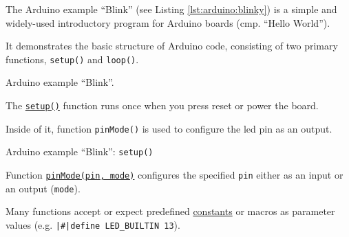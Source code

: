 \begin{frame}
    \par The Arduino\textregistered{} example ``Blink'' (see Listing \ref{lst:arduino:blinky}) is a simple and widely-used introductory program for Arduino\textregistered{} boards (cmp. ``Hello World'').
    \par It demonstrates the basic structure of Arduino\textregistered{} code, consisting of two primary functions, \texttt{setup()} and \texttt{loop()}.
    \begin{listing}[H]
        \caption{Arduino\textregistered{} example ``Blink''.}
        \label{lst:arduino:blinky}
    \end{listing}
\end{frame}

\begin{frame}
    \par The \href{https://www.arduino.cc/reference/en/language/structure/sketch/setup/}{\texttt{setup()}} function runs once when you press reset or power the board.
    \par Inside of it, function \texttt{pinMode()} is used to configure the \ac{led} pin as an output.
    \begin{listing}[H]
        \caption{Arduino\textregistered{} example ``Blink'': \texttt{setup()}}
        \label{lst:arduino:blinky:setup}
    \end{listing}
    \vspace{-1em}
    \par Function \href{https://www.arduino.cc/reference/en/language/functions/digital-io/pinmode/}{\texttt{pinMode(pin, mode)}} configures the specified \texttt{pin} either as an input or an output (\texttt{mode}).
    \par Many functions accept or expect predefined \href{https://www.arduino.cc/reference/en/language/variables/constants/constants/}{constants} or macros as parameter values (e.g. \texttt{|\#|define LED_BUILTIN 13}).
\end{frame}

